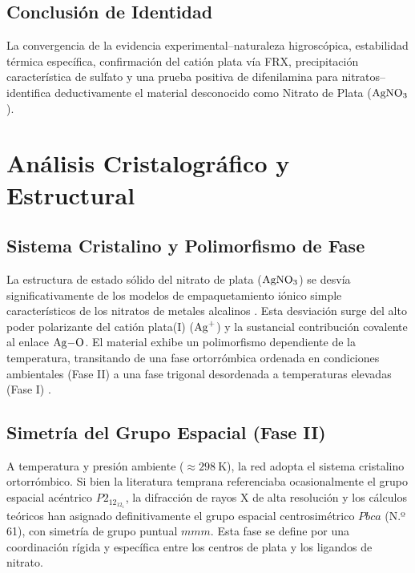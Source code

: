 \documentclass[pdflatex,sn-mathphys-num]{sn-jnl}
\theoremstyle{thmstyleone}%
\theoremstyle{thmstyletwo}%
\theoremstyle{thmstylethree}%
\begin{document}
\subsection{Conclusión de Identidad}
La convergencia de la evidencia experimental--naturaleza higroscópica,
estabilidad térmica específica, confirmación del catión plata vía FRX,
precipitación característica de sulfato y una prueba positiva de difenilamina
para nitratos--identifica deductivamente el material desconocido como Nitrato de
Plata ($\ce{AgNO3}$).

\section{Análisis Cristalográfico y Estructural}
\label{sec:crystallography}

\subsection{Sistema Cristalino y Polimorfismo de Fase}
La estructura de estado sólido del nitrato de plata ($\ce{AgNO3}$) se desvía
significativamente de los modelos de empaquetamiento iónico simple
característicos de los nitratos de metales alcalinos \cite{Singh2017}. Esta
desviación surge del alto poder polarizante del catión plata(I) ($\ce{Ag+}$) y
la sustancial contribución covalente al enlace $\ce{Ag-O}$. El material exhibe
un polimorfismo dependiente de la temperatura, transitando de una fase
ortorrómbica ordenada en condiciones ambientales (Fase II) a una fase trigonal
desordenada a temperaturas elevadas (Fase I) \cite{osti_1279797}.

\subsection{Simetría del Grupo Espacial (Fase II)}
A temperatura y presión ambiente ($\approx \qty{298}{\kelvin}$), la red adopta
el sistema cristalino ortorrómbico. Si bien la literatura temprana referenciaba
ocasionalmente el grupo espacial acéntrico $P2_12_12_1$, la difracción de rayos
X de alta resolución y los cálculos teóricos han asignado definitivamente el
grupo espacial centrosimétrico $Pbca$ (N.º 61), con simetría de grupo puntual
$mmm$. Esta fase se define por una coordinación rígida y específica entre los
centros de plata y los ligandos de nitrato.
\end{document}
